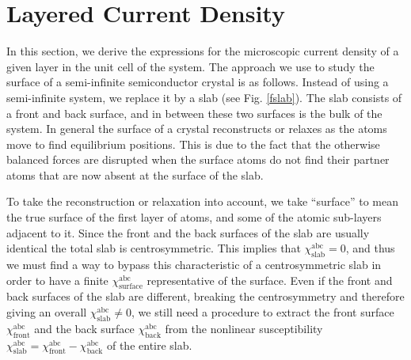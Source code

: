 
\section{Layered Current Density}\label{cd}

In this section, we derive the expressions for the microscopic current density
of a given layer in the unit cell of the system. The approach we use to study
the surface of a semi-infinite semiconductor crystal is as follows. Instead of
using a semi-infinite system, we replace it by a slab (see Fig. \ref{fslab}).
The slab consists of a front and back surface, and in between these two surfaces
is the bulk of the system. In general the surface of a crystal reconstructs or
relaxes as the atoms move to find equilibrium positions. This is due to the fact
that the otherwise balanced forces are disrupted when the surface atoms do not
find their partner atoms that are now absent at the surface of the slab.

To take the reconstruction or relaxation into account, we take ``surface'' to
mean the true surface of the first layer of atoms, and some of the atomic
sub-layers adjacent to it. Since the front and the back surfaces of the slab are
usually identical the total slab is centrosymmetric. This implies that
$\chi^{\mathrm{abc}}_{\mathrm{slab}} = 0$, and thus we must find a way to bypass
this characteristic of a centrosymmetric slab in order to have a finite
$\chi^{\mathrm{abc}}_{\mathrm{surface}}$ representative of the surface. Even if the front and
back surfaces of the slab are different, breaking the centrosymmetry and
therefore giving an overall $\chi^{\mathrm{abc}}_{\mathrm{slab}}\ne 0$, we still
need a procedure to extract the front surface $\chi^{\mathrm{abc}}_{\mathrm{front}}$ and the
back surface $\chi^{\mathrm{abc}}_{\mathrm{back}}$ from the nonlinear susceptibility $\chi^{\mathrm{abc}}_{\mathrm{slab}} = \chi^{\mathrm{abc}}_{\mathrm{front}} - \chi^{\mathrm{abc}}_{\mathrm{back}}$ of the
entire slab.

